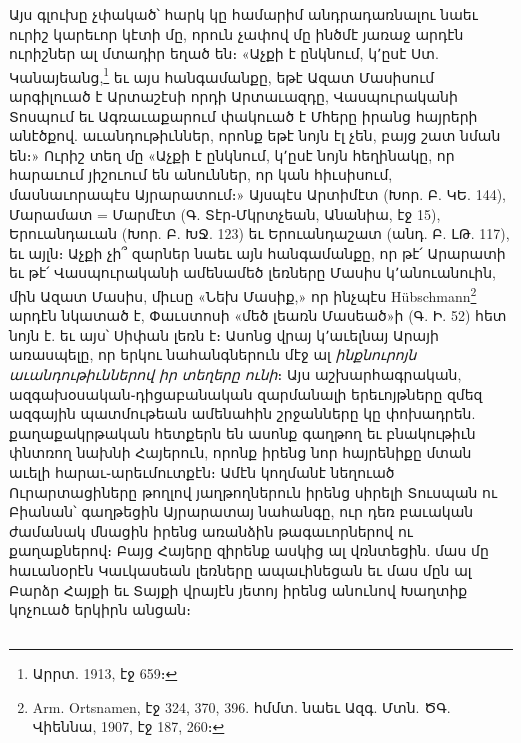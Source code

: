 \documentclass{article}
\begin{document}
{Այս գլուխը չփակած՝ հարկ կը համարիմ անդրադառնալու նաեւ ուրիշ կարեւոր կէտի մը, որուն չափով մը ինծմէ յառաջ արդէն ուրիշներ ալ մտադիր եղած են։ «Աչքի է ընկնում, կ՚ըսէ Ստ. Կանայեանց,\footnote{Արրտ. 1913, էջ 659։} եւ այս հանգամանքը, եթէ Ազատ Մասիսում արգիլուած է Արտաշէսի որդի Արտաւազդը, Վասպուրականի Տոսպում եւ Ագռաւաքարում փակուած է Մհերը իրանց հայրերի անէծքով. աւանդութիւններ, որոնք եթէ նոյն էլ չեն, բայց շատ նման են։» Ուրիշ տեղ մը «Աչքի է ընկնում, կ՚ըսէ նոյն հեղինակը, որ հարաւում յիշուում են անուններ, որ կան հիւսիսում, մասնաւորապէս Այրարատում։» Այսպէս Արտիմէտ (Խոր. Բ. ԿԵ. 144), Մարամատ = Մարմէտ (Գ. Տէր֊Մկրտչեան, Անանիա, էջ 15), Երուանդաւան (Խոր. Բ. ԽՋ. 123) եւ Երուանդաշատ (անդ. Բ. ԼԹ. 117), եւ այլն։ Աչքի չի՞ զարներ նաեւ այն հանգամանքը, որ թէ՛ Արարատի եւ թէ՛ Վասպուրականի ամենամեծ լեռները Մասիս կ՚անուանուին, մին Ազատ Մասիս, միւսը «Նեխ Մասիք,» որ ինչպէս Hübschmann\footnote{Arm. Ortsnamen, էջ 324, 370, 396. հմմտ. նաեւ Ազգ. Մտն. ԾԳ. Վիեննա, 1907, էջ 187, 260։} արդէն նկատած է, Փաւստոսի «մեծ լեառն Մասեած»ի (Գ. Ի. 52) հետ նոյն է. եւ այս՝ Սիփան լեռն է։ Ասոնց վրայ կ՚աւելնայ Արայի առասպելը, որ երկու նահանգներուն մէջ ալ \emph{ինքնուրոյն աւանդութիւններով իր տեղերը ունի}։ Այս աշխարհագրական, ազգախօսական֊դիցաբանական զարմանալի երեւոյթները զմեզ ազգային պատմութեան ամենահին շրջանները կը փոխադրեն. քաղաքակրթական հետքերն են ասոնք գաղթող եւ բնակութիւն փնտռող նախնի Հայերուն, որոնք իրենց նոր հայրենիքը մտան աւելի հարաւ֊արեւմուտքէն։ Ամէն կողմանէ նեղուած Ուրարտացիները թողլով յաղթողներուն իրենց սիրելի Տուսպան ու Բիանան՝ գաղթեցին Այրարատայ նահանգը, ուր դեռ բաւական ժամանակ մնացին իրենց առանձին թագաւորներով ու քաղաքներով։ Բայց Հայերը զիրենք ասկից ալ վռնտեցին. մաս մը հաւանօրէն Կաւկասեան լեռները ապաւինեցան եւ մաս մըն ալ Բարձր Հայքի եւ Տայքի վրայէն յետոյ իրենց անունով Խաղտիք կոչուած երկիրն անցան։}
\clearpage
\subsection{}
\end{document}
